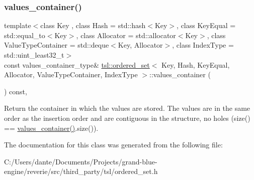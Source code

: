 \subsubsection{\texorpdfstring{values\_container()}{values\_container()}}
{\footnotesize\ttfamily template$<$class Key , class Hash  = std\+::hash$<$\+Key$>$, class Key\+Equal  = std\+::equal\+\_\+to$<$\+Key$>$, class Allocator  = std\+::allocator$<$\+Key$>$, class Value\+Type\+Container  = std\+::deque$<$\+Key, Allocator$>$, class Index\+Type  = std\+::uint\+\_\+least32\+\_\+t$>$ \\
const values\+\_\+container\+\_\+type\& \mbox{\hyperlink{classtsl_1_1ordered__set}{tsl\+::ordered\+\_\+set}}$<$ Key, Hash, Key\+Equal, Allocator, Value\+Type\+Container, Index\+Type $>$\+::values\+\_\+container (\begin{DoxyParamCaption}{ }\end{DoxyParamCaption}) const\hspace{0.3cm}{\ttfamily [inline]}, {\ttfamily [noexcept]}}

Return the container in which the values are stored. The values are in the same order as the insertion order and are contiguous in the structure, no holes (size() == \mbox{\hyperlink{classtsl_1_1ordered__set_a1bc951514a5c4c29c14b6cf5177cf1ec}{values\+\_\+container()}}.size()). 

The documentation for this class was generated from the following file\+:\begin{DoxyCompactItemize}
\item 
C\+:/\+Users/dante/\+Documents/\+Projects/grand-\/blue-\/engine/reverie/src/third\+\_\+party/tsl/ordered\+\_\+set.\+h\end{DoxyCompactItemize}
